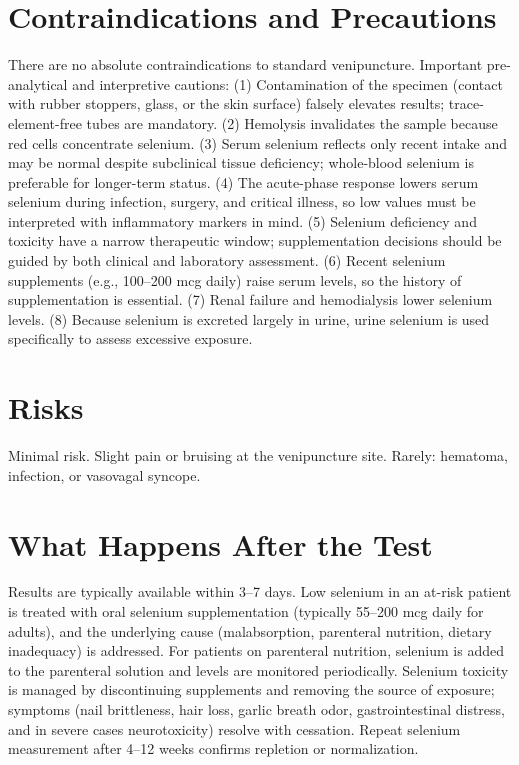 \section*{Contraindications and Precautions}
There are no absolute contraindications to standard venipuncture. Important pre-analytical and interpretive cautions: (1) Contamination of the specimen (contact with rubber stoppers, glass, or the skin surface) falsely elevates results; trace-element-free tubes are mandatory. (2) Hemolysis invalidates the sample because red cells concentrate selenium. (3) Serum selenium reflects only recent intake and may be normal despite subclinical tissue deficiency; whole-blood selenium is preferable for longer-term status. (4) The acute-phase response lowers serum selenium during infection, surgery, and critical illness, so low values must be interpreted with inflammatory markers in mind. (5) Selenium deficiency and toxicity have a narrow therapeutic window; supplementation decisions should be guided by both clinical and laboratory assessment. (6) Recent selenium supplements (e.g., 100--200 mcg daily) raise serum levels, so the history of supplementation is essential. (7) Renal failure and hemodialysis lower selenium levels. (8) Because selenium is excreted largely in urine, urine selenium is used specifically to assess excessive exposure.

\section*{Risks}
Minimal risk. Slight pain or bruising at the venipuncture site. Rarely: hematoma, infection, or vasovagal syncope.

\section*{What Happens After the Test}
Results are typically available within 3--7 days. Low selenium in an at-risk patient is treated with oral selenium supplementation (typically 55--200 mcg daily for adults), and the underlying cause (malabsorption, parenteral nutrition, dietary inadequacy) is addressed. For patients on parenteral nutrition, selenium is added to the parenteral solution and levels are monitored periodically. Selenium toxicity is managed by discontinuing supplements and removing the source of exposure; symptoms (nail brittleness, hair loss, garlic breath odor, gastrointestinal distress, and in severe cases neurotoxicity) resolve with cessation. Repeat selenium measurement after 4--12 weeks confirms repletion or normalization.

